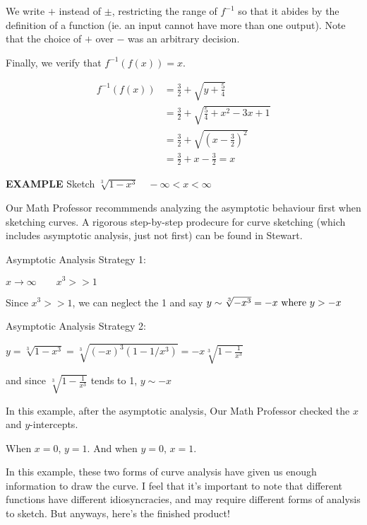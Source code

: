 \documentclass{article}
\begin{document}
We write $+$ instead of $\pm$, restricting the range of $f^{-1}$ so that it abides by the definition of a function (ie. an input cannot have more than one output). Note that the choice of $+$ over $-$ was an arbitrary decision.

\vspace{10pt}

Finally, we verify that $f^{-1}(f(x))=x$.

\begin{align*}
f^{-1}(f(x))&=\frac{3}{2}+\sqrt{y+\frac{5}{4}}\\
&=\frac{3}{2}+\sqrt{\frac{5}{4}+x^2-3x+1}\\
&=\frac{3}{2}+\sqrt{\left(x-\frac{3}{2}\right)^2}\\
&=\frac{3}{2}+x-\frac{3}{2}=x
\end{align*}

{\bf{}EXAMPLE} Sketch $\sqrt[3]{1-x^3}\quad-\infty<x<\infty$

\vspace{10pt}

Our Math Professor recommmends analyzing the asymptotic behaviour first when sketching curves. A rigorous step-by-step prodecure for curve sketching (which includes asymptotic analysis, just not first) can be found in Stewart.

\vspace{10pt}

Asymptotic Analysis Strategy 1:

$x\to\infty\qquad x^3>>1$

Since $x^3>>1$, we can neglect the 1 and say $y\sim\sqrt[3]{-x^3}=-x\textnormal{ where }y>-x$

\vspace{10pt}

Asymptotic Analysis Strategy 2:

$y=\sqrt[3]{1-x^3}=\sqrt[3]{(-x)^3(1-1/x^3)}=-x\sqrt[3]{1-\frac{1}{x^3}}$

and since $\sqrt[3]{1-\frac{1}{x^3}}$ tends to 1, $y\sim-x$

\vspace{10pt}

In this example, after the asymptotic analysis, Our Math Professor checked the $x$ and $y$-intercepts.

When $x=0$, $y=1$. And when $y=0$, $x=1$.

\vspace{10pt}

In this example, these two forms of curve analysis have given us enough information to draw the curve. I feel that it's important to note that different functions have different idiosyncracies, and may require different forms of analysis to sketch. But anyways, here's the finished product!
\end{document}
